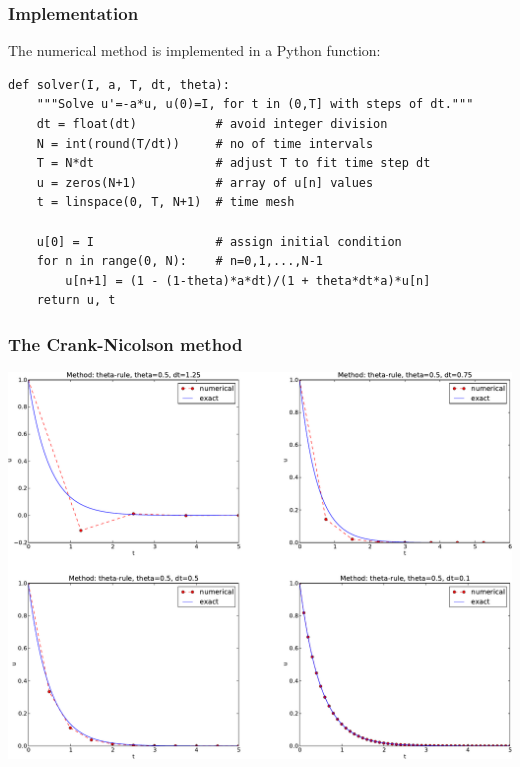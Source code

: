 \documentclass{beamer}
\begin{document}
\begin{frame}
\frametitle{Implementation}

The numerical method is implemented in a Python function:

\begin{verbatim}
def solver(I, a, T, dt, theta):
    """Solve u'=-a*u, u(0)=I, for t in (0,T] with steps of dt."""
    dt = float(dt)           # avoid integer division
    N = int(round(T/dt))     # no of time intervals
    T = N*dt                 # adjust T to fit time step dt
    u = zeros(N+1)           # array of u[n] values
    t = linspace(0, T, N+1)  # time mesh

    u[0] = I                 # assign initial condition
    for n in range(0, N):    # n=0,1,...,N-1
        u[n+1] = (1 - (1-theta)*a*dt)/(1 + theta*dt*a)*u[n]
    return u, t
\end{verbatim}
\end{frame}

\begin{frame}
\frametitle{The Crank-Nicolson method}

\begin{center}  %
  \centerline{\includegraphics[width=0.9\linewidth]{fig/CN.pdf}}
\end{center}
\end{frame}
\end{document}
